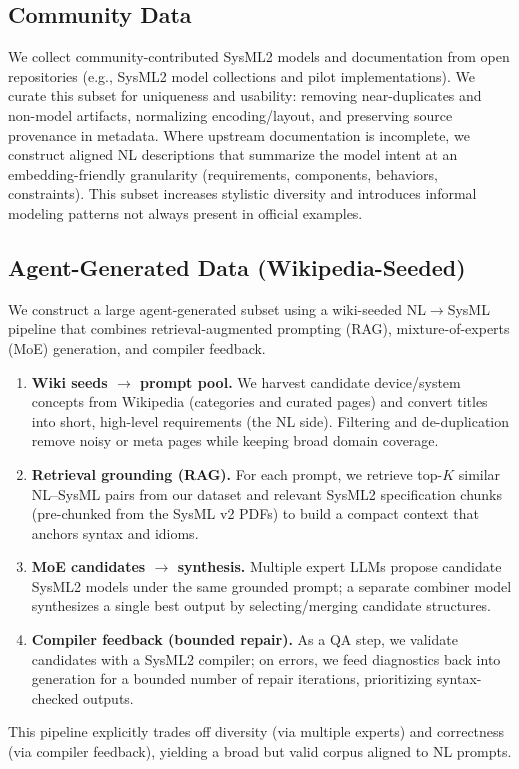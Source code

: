 \documentclass{article}
\begin{document}
\subsection{Community Data}
We collect community-contributed SysML2 models and documentation from open repositories (e.g., SysML2 model collections and pilot implementations). We curate this subset for uniqueness and usability: removing near-duplicates and non-model artifacts, normalizing encoding/layout, and preserving source provenance in metadata. Where upstream documentation is incomplete, we construct aligned NL descriptions that summarize the model intent at an embedding-friendly granularity (requirements, components, behaviors, constraints). This subset increases stylistic diversity and introduces informal modeling patterns not always present in official examples.

\subsection{Agent-Generated Data (Wikipedia-Seeded)}
We construct a large agent-generated subset using a wiki-seeded NL$\rightarrow$SysML pipeline that combines retrieval-augmented prompting (RAG), mixture-of-experts (MoE) generation, and compiler feedback.
\begin{enumerate}
\item \textbf{Wiki seeds $\rightarrow$ prompt pool.} We harvest candidate device/system concepts from Wikipedia (categories and curated pages) and convert titles into short, high-level requirements (the NL side). Filtering and de-duplication remove noisy or meta pages while keeping broad domain coverage.
\item \textbf{Retrieval grounding (RAG).} For each prompt, we retrieve top-$K$ similar NL--SysML pairs from our dataset and relevant SysML2 specification chunks (pre-chunked from the SysML v2 PDFs) to build a compact context that anchors syntax and idioms.
\item \textbf{MoE candidates $\rightarrow$ synthesis.} Multiple expert LLMs propose candidate SysML2 models under the same grounded prompt; a separate combiner model synthesizes a single best output by selecting/merging candidate structures.
\item \textbf{Compiler feedback (bounded repair).} As a QA step, we validate candidates with a SysML2 compiler; on errors, we feed diagnostics back into generation for a bounded number of repair iterations, prioritizing syntax-checked outputs.
\end{enumerate}
This pipeline explicitly trades off diversity (via multiple experts) and correctness (via compiler feedback), yielding a broad but valid corpus aligned to NL prompts.
\end{document}
